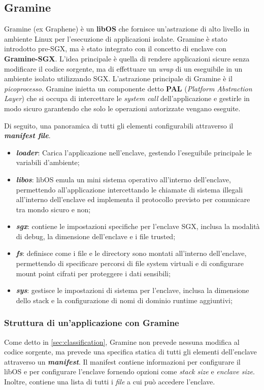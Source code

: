 \documentclass{article}
\begin{document}
\subsection{Gramine}\label{sec:gramine}
Gramine\cite{GramineDocs} (ex Graphene) è un \textbf{libOS} che fornisce un'astrazione di alto livello in ambiente Linux per l'esecuzione di applicazioni isolate. Gramine è stato introdotto pre-SGX, ma è stato integrato con il concetto di enclave con \textbf{Gramine-SGX}. L'idea principale è quella di rendere applicazioni sicure senza modificare il codice sorgente, ma di effettuare un \textit{wrap} di un eseguibile in un ambiente isolato utilizzando SGX. 
L'astrazione principale di Gramine è il \textit{picoprocesso}\cite{Tsai2017}. Gramine inietta un componente detto \textbf{PAL} (\textit{Platform Abstraction Layer}) che si occupa di intercettare le \textit{system call} dell'applicazione e gestirle in modo sicuro garantendo che solo le operazioni autorizzate vengano eseguite. 

Di seguito, una panoramica di tutti gli elementi configurabili attraverso il \textbf{\textit{manifest file}}.
\begin{itemize}
  \item \textbf{\textit{loader}}: Carica l'applicazione nell'enclave, gestendo l'eseguibile principale le variabili d'ambiente;
  \item \textbf{\textit{libos}}: libOS emula un mini sistema operativo all'interno dell'enclave, permettendo all'applicazione intercettando le chiamate di sistema illegali all'interno dell'enclave ed implementa il protocollo previsto per comunicare tra mondo sicuro e non;
  \item \textbf{\textit{sgx}}: contiene le impostazioni specifiche per l'enclave SGX, inclusa la modalità di debug, la dimensione dell'enclave e i file trusted;   
  \item \textbf{\textit{fs}}: definisce come i file e le directory sono montati all'interno dell'enclave, permettendo di specificare percorsi di file system virtuali e di configurare mount point cifrati per proteggere i dati sensibili;
  \item \textbf{\textit{sys}}: gestisce le impostazioni di sistema per l'enclave, inclusa la dimensione dello stack e la configurazione di nomi di dominio runtime aggiuntivi;
\end{itemize}

\subsubsection{Struttura di un'applicazione con Gramine}
Come detto in \cref{sec:classification}, Gramine non prevede nessuna modifica al codice sorgente, ma prevede una specifica statica di tutti gli elementi dell'enclave attraverso un \textbf{\textit{manifest}}. Il manifest contiene informazioni per configurare il libOS e per configurare l'enclave fornendo opzioni come \textit{stack size} e \textit{enclave size}. Inoltre, contiene una lista di tutti i \textit{file} a cui può accedere l'enclave.
\end{document}
